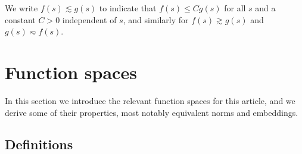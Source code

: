 \documentclass{amsart}
\theoremstyle{definition}
\numberwithin{equation}{section}
\begin{document}
We write $f(s)\lesssim g(s)$ to indicate that $f(s)\leq Cg(s)$ for all $s$ and a constant $C>0$ independent of $s$, and similarly for $f(s)\gtrsim g(s)$ and $g(s)\eqsim f(s)$.


\section{Function spaces}
\label{section:FunctionSpaces}

In this section we introduce the relevant function spaces for this article, and we derive some of their properties, most notably equivalent norms and embeddings. 

\subsection{Definitions}\label{subsec:def}
\end{document}
